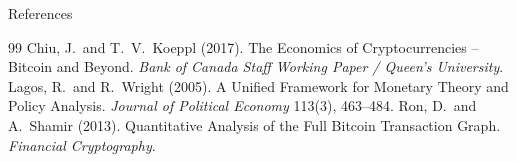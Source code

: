 \documentclass[aspectratio=169,xcolor=dvipsnames]{beamer}
\begin{document}
\begin{frame}[allowframebreaks]{References}
    \small
    \begin{thebibliography}{99}
            Chiu, J.\ and T.\ V.\ Koeppl (2017). The Economics of Cryptocurrencies --
            Bitcoin and Beyond. \textit{Bank of Canada Staff Working Paper / Queen's University}.
            Lagos, R.\ and R.\ Wright (2005). A Unified Framework for Monetary Theory
            and Policy Analysis. \textit{Journal of Political Economy} 113(3), 463--484.
            Ron, D.\ and A.\ Shamir (2013). Quantitative Analysis of the Full Bitcoin Transaction Graph.
            \textit{Financial Cryptography}.
    \end{thebibliography}
\end{frame}
\end{document}
